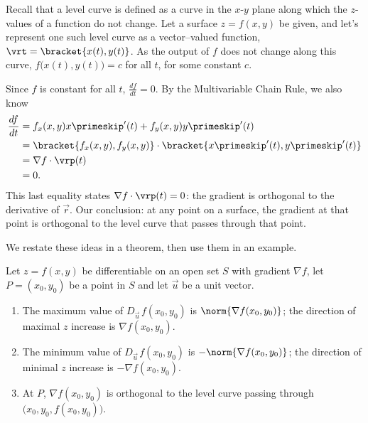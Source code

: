 Recall that a level curve is defined as a curve in the $x$-$y$ plane along which the $z$-values of a function do not change. Let a surface $z=f(x,y)$ be given, and let's represent one such level curve as a vector--valued function, $\vrt =\bracket{x(t), y(t)}$. As the output of $f$ does not change along this curve, $f\big(x(t),y(t)\big) = c$ for all $t$, for some constant $c$.

Since $f$ is constant for all $t$, $\frac{df}{dt} = 0$. By the Multivariable Chain Rule, we also know
\begin{align*}
\frac{df}{dt} &= f_x(x,y)x\primeskip'(t) + f_y(x,y)y\primeskip'(t)\\
	&=\bracket{f_x(x,y),f_y(x,y)}\cdot\bracket{x\primeskip'(t),y\primeskip'(t)}\\
						&= \nabla f \cdot \vrp(t)\\
						&=0.
\end{align*}
This last equality states $\nabla f \cdot \vrp(t) = 0$: the gradient is orthogonal to the derivative of $\vec r$. Our conclusion: at any point on a surface, the gradient at that point is orthogonal to the level curve that passes through that point.

We restate these ideas in a theorem, then use them in an example.

{Let $z=f(x,y)$ be differentiable on an open set $S$ with gradient $\nabla f$, let $P=(x_0,y_0)$ be a point in $S$ and let $\vec u$ be a unit vector.
\begin{enumerate}
	\item The maximum value of $D_{\vec u\,}f(x_0,y_0)$ is $\norm{\nabla f(x_0,y_0)}$; the direction of maximal $z$ increase is $\nabla f(x_0,y_0)$.
	\item   The minimum value of $D_{\vec u\,}f(x_0,y_0)$ is $-\norm{\nabla f(x_0,y_0)}$; the direction of minimal $z$ increase is $-\nabla f(x_0,y_0)$.
	\item At $P$, $\nabla f(x_0,y_0)$ is orthogonal to the level curve passing through $\big(x_0,y_0,f(x_0,y_0)\big)$.
\end{enumerate}
}

